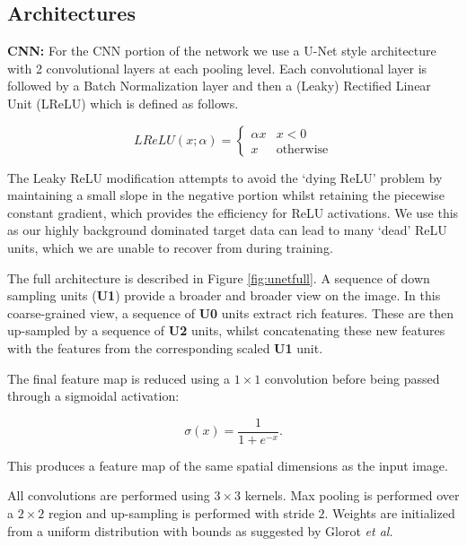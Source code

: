 \documentclass[journal,transmag]{IEEEtran}
\begin{document}
\subsection{Architectures}
\label{sec:architectures}

\textbf{CNN: } For the CNN portion of the network we use a U-Net style architecture \cite{Ronneberger2015} with 2 convolutional layers at each pooling level. Each convolutional layer is followed by a Batch Normalization \cite{Ioffe2015} layer and then a (Leaky) Rectified Linear Unit (LReLU) which is defined as follows.

\begin{equation}
LReLU(x; \alpha) = \left\{
\begin{array}{rl}
\alpha x & x < 0 \\
x & \mbox{otherwise}
\end{array} \right.
\end{equation}

The Leaky ReLU modification attempts to avoid the `dying ReLU' problem by maintaining a small slope in the negative portion whilst retaining the piecewise constant gradient, which provides the efficiency for ReLU activations. We use this as our highly background dominated target data can lead to many `dead' ReLU units, which we are unable to recover from during training.

The full architecture is described in Figure \ref{fig:unetfull}. A sequence of down sampling units (\textbf{U1}) provide a broader and broader view on the image. In this coarse-grained view, a sequence of \textbf{U0} units extract rich features. These are then up-sampled by a sequence of \textbf{U2} units, whilst concatenating these new features with the features from the corresponding scaled \textbf{U1} unit.

The final feature map is reduced using a $1\times1$ convolution before being passed through a sigmoidal activation:

\begin{equation}
\sigma(x) = \frac{1}{1 + e^{-x}}.
\end{equation}

This produces a feature map of the same spatial dimensions as the input image.

All convolutions are performed using $3 \times 3$ kernels. Max pooling is performed over a $2 \times 2$ region and up-sampling is performed with stride $2$. Weights are initialized from a uniform distribution with bounds as suggested by Glorot \textit{et al.} \cite{Glorot}
\end{document}

